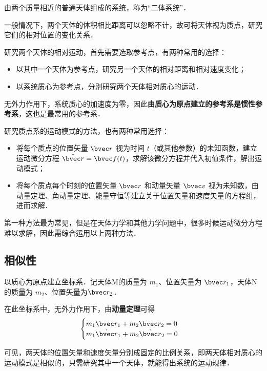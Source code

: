 

由两个质量相近的普通天体组成的系统，称为“二体系统”．

一般情况下，两个天体的体积相比距离可以忽略不计，故可将天体视为质点，研究它们的相对位置的变化关系．

研究两个天体的相对运动，首先需要选取参考点，有两种常用的选择：
\begin{itemize}
\item 以其中一个天体为参考点，研究另一个天体的相对距离和相对速度变化；
\item 以系统质心为参考点，分别研究两个天体相对质心的运动．
\end{itemize}

无外力作用下，系统质心的加速度为零，因此\textbf{由质心为原点建立的参考系是惯性参考系}，这也是最常用的参考系．

研究质点系的运动模式的方法，也有两种常用选择：
\begin{itemize}
\item 将每个质点的位置矢量 $\bvec r$ 视为时间 $t$（或其他参数）的未知函数，建立运动微分方程 $\ddot{\bvec r}= \bvec f (t)$，求解该微分方程并代入初值条件，解出运动模式；
\item 将每个质点每个时刻的位置矢量 $\bvec r$ 和动量矢量 $\bvec v$ 视为未知数，由动量定理、角动量定理、能量守恒等建立关于位置矢量和速度矢量的方程组，进而求解．
\end{itemize}
第一种方法最为常见，但是在天体力学和其他力学问题中，很多时候运动微分方程难以求解，因此需综合运用以上两种方法．

\subsection{相似性}
以质心为原点建立坐标系．记天体M的质量为 $m_1$、位置矢量为 $\bvec r_1$，天体N的质量为 $m_2$、位置矢量为$\bvec r_2$．

在此坐标系中，无外力作用下，由\textbf{动量定理}可得
\begin{equation}
\begin{cases}
m_1 \bvec r_1 + m_2 \bvec r_2 = 0\\
m_1 \dot{\bvec r}_1 + m_2 \dot{\bvec r}_2=0
\end{cases}
\end{equation}

可见，两天体的位置矢量和速度矢量分别成固定的比例关系，即两天体相对质心的运动模式是相似的，只需研究其中一个天体，就能得出系统的运动规律．


